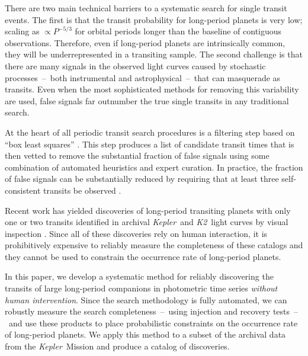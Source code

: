 \documentclass[manuscript, letterpaper]{aastex6}
\makeatletter
\let\origsection\section
\renewcommand\section{\@ifstar{\starsection}{\nostarsection}}
\newcommand\nostarsection[1]{\sectionprelude\origsection{#1}}
\newcommand\starsection[1]{\sectionprelude\origsection*{#1}}
\newcommand\sectionprelude{\vspace{1em}}
\newcommand{\project}[1]{\textsl{#1}}
\newcommand{\kepler}{\project{Kepler}}
\newcommand{\KT}{\project{K2}}
\newcommand{\bls}{\project{BLS}}
\newcommand{\sectlabel}[1]{\label{sect:#1}}
\newcommand{\paper}{paper}
\makeatother
\begin{document}
There are two main technical barriers to a systematic search for single
transit events.
The first is that the transit probability for long-period planets is very low;
scaling as $\propto P^{-5/3}$ for orbital periods longer than the
baseline of contiguous observations.
Therefore, even if long-period planets are intrinsically common, they will
be underrepresented in a transiting sample.
The second challenge is that there are many signals in the observed light
curves caused by stochastic processes~--~both instrumental and
astrophysical~--~that can masquerade as transits.
Even when the most sophisticated methods for removing this variability are
used, false signals far outnumber the true single transits in any traditional
search.

At the heart of all periodic transit search procedures is a filtering step
based on ``box least squares'' \citep[\bls;][]{Kovacs:2002}.
This step produces a list of candidate transit times that is then vetted to
remove the substantial fraction of false signals using some combination of
automated heuristics and expert curation.
In practice, the fraction of false signals can be substantially reduced by
requiring that at least three self-consistent transits be observed
\citep{Petigura:2013, Burke:2014, Rowe:2015, Coughlin:2016}.

Recent work has yielded discoveries of long-period transiting planets with
only one or two transits identified in archival \kepler\ and \KT\ light curves
by visual inspection \citep{Wang:2013, Kipping:2014a, Osborn:2016,
Kipping:2016, Uehara:2016, Wang:2015}.
Since all of these discoveries rely on human interaction, it is prohibitively
expensive to reliably measure the completeness of these catalogs and they
cannot be used to constrain the occurrence rate of long-period planets.

In this \paper, we develop a systematic method for reliably discovering the
transits of large long-period companions in photometric time series
\emph{without human intervention}.
Since the search methodology is fully automated, we can robustly measure the
search completeness~--~using injection and recovery tests~--~and use these
products to place probabilistic constraints on the occurrence rate of
long-period planets.
We apply this method to a subset of the archival data from the \kepler\
Mission and produce a catalog of discoveries.


\section{A fully automated search method}\sectlabel{search}
\end{document}
